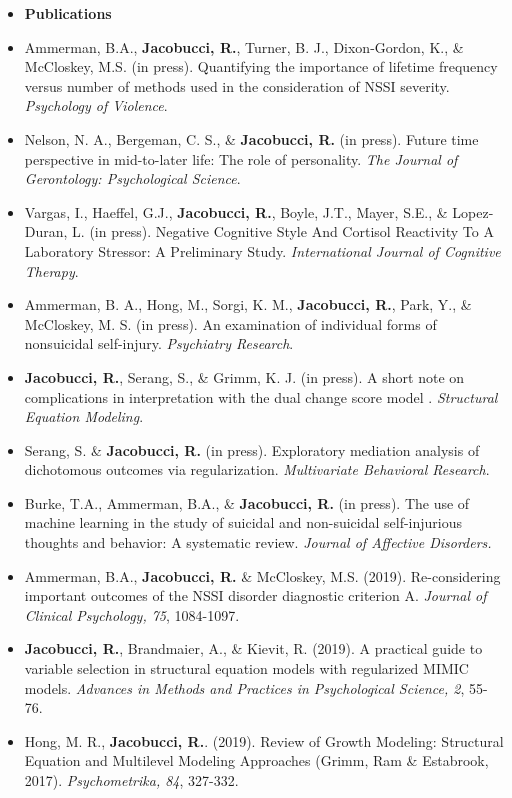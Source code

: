 \documentclass[letterpaper,10pt]{article}
\begin{document}
\begin{itemize}
\item {\textbf{\large{Publications}}}
%
\item[] Ammerman, B.A., \textbf{Jacobucci, R.}, Turner, B. J., Dixon-Gordon, K., \& McCloskey, M.S. (in press). Quantifying the importance of lifetime frequency versus number of methods used in the consideration of NSSI severity. \emph{Psychology of Violence}.
%
\item[] Nelson, N. A., Bergeman, C. S., \& \textbf{Jacobucci, R.} (in press). Future time perspective in mid-to-later life: The role of personality. \emph{The Journal of Gerontology: Psychological Science}.
% 
\item[] Vargas, I., Haeffel, G.J., \textbf{Jacobucci, R.}, Boyle, J.T., Mayer, S.E., \& Lopez-Duran, L. (in press). Negative Cognitive Style And Cortisol Reactivity To A Laboratory Stressor: A Preliminary Study. \emph{International Journal of Cognitive Therapy}. 
%
\item[] Ammerman, B. A., Hong, M., Sorgi, K. M., \textbf{Jacobucci, R.}, Park, Y., \& McCloskey, M. S. (in press). An examination of individual forms of nonsuicidal self-injury. \emph{Psychiatry Research}.
%
\item[] \textbf{Jacobucci, R.}, Serang, S., \& Grimm, K. J. (in press). A short note on complications in interpretation with the dual change score model . \emph{Structural Equation Modeling}.
% 
\item[]Serang, S. \& \textbf{Jacobucci, R.} (in press). Exploratory mediation analysis of dichotomous outcomes via regularization. \emph{Multivariate Behavioral Research}.
%
\item[] Burke, T.A., Ammerman, B.A., \& \textbf{Jacobucci, R.} (in press). The use of machine learning in the study of suicidal and non-suicidal self-injurious thoughts and behavior: A systematic review. \emph{Journal of Affective Disorders.}
%
\item[] Ammerman, B.A., \textbf{Jacobucci, R.} \& McCloskey, M.S. (2019). Re-considering important outcomes of the NSSI disorder diagnostic criterion A. \emph{Journal of Clinical Psychology, 75}, 1084-1097.
% 
\item[] \textbf{Jacobucci, R.}, Brandmaier, A., \& Kievit, R. (2019). A practical guide to variable selection in structural equation models with regularized MIMIC models. \emph{Advances in Methods and Practices in Psychological Science, 2}, 55-76.  
% 
\item[]Hong, M. R., \textbf{Jacobucci, R.}. (2019). Review of Growth Modeling: Structural Equation and Multilevel Modeling Approaches (Grimm, Ram \& Estabrook, 2017). \emph{Psychometrika, 84}, 327-332.

\end{itemize}
\end{document}
